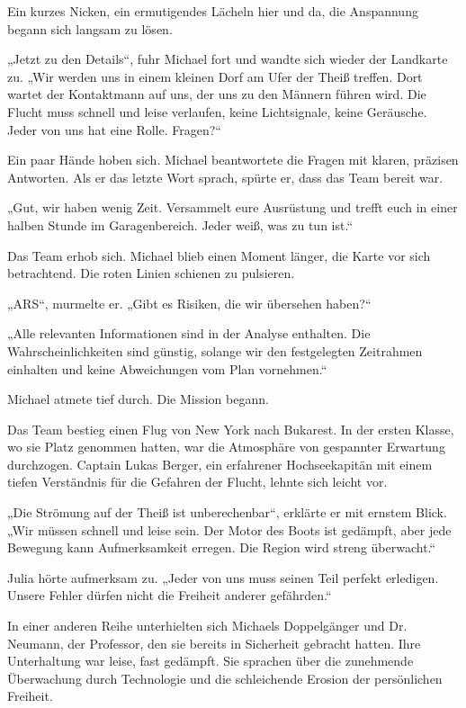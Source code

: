\documentclass[
]{article}
\begin{document}
Ein kurzes Nicken, ein ermutigendes Lächeln hier und da, die Anspannung begann sich langsam zu lösen.

„Jetzt zu den Details``, fuhr Michael fort und wandte sich wieder der Landkarte zu. „Wir werden uns in einem kleinen Dorf am Ufer der Theiß treffen. Dort wartet der Kontaktmann auf uns, der uns zu den Männern führen wird. Die Flucht muss schnell und leise verlaufen, keine Lichtsignale, keine Geräusche. Jeder von uns hat eine Rolle. Fragen?{\kern0pt}``

Ein paar Hände hoben sich. Michael beantwortete die Fragen mit klaren, präzisen Antworten. Als er das letzte Wort sprach, spürte er, dass das Team bereit war.

„Gut, wir haben wenig Zeit. Versammelt eure Ausrüstung und trefft euch in einer halben Stunde im Garagenbereich. Jeder weiß, was zu tun ist.``

Das Team erhob sich. Michael blieb einen Moment länger, die Karte vor sich betrachtend. Die roten Linien schienen zu pulsieren.

„ARS``, murmelte er. „Gibt es Risiken, die wir übersehen haben?{\kern0pt}``

„Alle relevanten Informationen sind in der Analyse enthalten. Die Wahrscheinlichkeiten sind günstig, solange wir den festgelegten Zeitrahmen einhalten und keine Abweichungen vom Plan vornehmen.``

Michael atmete tief durch. Die Mission begann.

Das Team bestieg einen Flug von New York nach Bukarest. In der ersten Klasse, wo sie Platz genommen hatten, war die Atmosphäre von gespannter Erwartung durchzogen. Captain Lukas Berger, ein erfahrener Hochseekapitän mit einem tiefen Verständnis für die Gefahren der Flucht, lehnte sich leicht vor.

„Die Strömung auf der Theiß ist unberechenbar``, erklärte er mit ernstem Blick. „Wir müssen schnell und leise sein. Der Motor des Boots ist gedämpft, aber jede Bewegung kann Aufmerksamkeit erregen. Die Region wird streng überwacht.``

Julia hörte aufmerksam zu. „Jeder von uns muss seinen Teil perfekt erledigen. Unsere Fehler dürfen nicht die Freiheit anderer gefährden.``

In einer anderen Reihe unterhielten sich Michaels Doppelgänger und Dr. Neumann, der Professor, den sie bereits in Sicherheit gebracht hatten. Ihre Unterhaltung war leise, fast gedämpft. Sie sprachen über die zunehmende Überwachung durch Technologie und die schleichende Erosion der persönlichen Freiheit.
\end{document}
